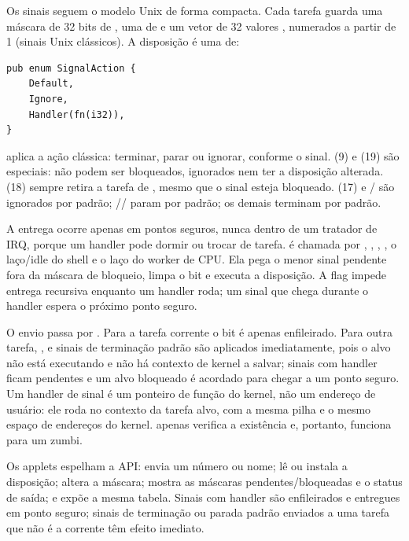 Os sinais seguem o modelo Unix de forma compacta. Cada tarefa guarda uma
m\'ascara de 32 bits de , uma de  e um vetor de 32
valores , numerados a partir de 1 (sinais Unix
cl\'assicos). A disposi\c{c}\~ao \'e uma de:

\begin{lstlisting}[caption={Disposi\c{c}\~oes de sinal.},label={lst:signalspt}]
pub enum SignalAction {
    Default,
    Ignore,
    Handler(fn(i32)),
}
\end{lstlisting}

 aplica a a\c{c}\~ao cl\'assica: terminar, parar ou ignorar,
conforme o sinal.  (9) e  (19) s\~ao especiais:
n\~ao podem ser bloqueados, ignorados nem ter a disposi\c{c}\~ao alterada.
 (18) sempre retira a tarefa de , mesmo que o
sinal esteja bloqueado.  (17) e
/ s\~ao ignorados por padr\~ao;
// param por padr\~ao; os demais
terminam por padr\~ao.

A entrega ocorre apenas em pontos seguros, nunca dentro de um tratador de
IRQ, porque um handler pode dormir ou trocar de tarefa. 
\'e chamada por , , ,
, o la\c{c}o/idle do shell e o la\c{c}o do worker de CPU.
Ela pega o menor sinal pendente fora da m\'ascara de bloqueio, limpa o bit e
executa a disposi\c{c}\~ao. A flag  impede entrega
recursiva enquanto um handler roda; um sinal que chega durante o handler
espera o pr\'oximo ponto seguro.

O envio passa por . Para a tarefa corrente o bit
\'e apenas enfileirado. Para outra tarefa, ,  e
sinais de termina\c{c}\~ao padr\~ao s\~ao aplicados imediatamente, pois o alvo
n\~ao est\'a executando e n\~ao h\'a contexto de kernel a salvar; sinais com
handler ficam pendentes e um alvo bloqueado \'e acordado para chegar a um
ponto seguro. Um handler de sinal \'e um ponteiro de fun\c{c}\~ao do kernel,
n\~ao um endere\c{c}o de usu\'ario: ele roda no contexto da tarefa alvo, com a
mesma pilha e o mesmo espa\c{c}o de endere\c{c}os do kernel.
 apenas verifica a exist\^encia e, portanto, funciona para
um zumbi.

Os applets espelham a API:  envia um n\'umero ou nome;
 l\^e ou instala a disposi\c{c}\~ao;  altera a
m\'ascara;  mostra as m\'ascaras pendentes/bloqueadas e o status de
sa\'ida; e  exp\~oe a mesma tabela. Sinais com handler s\~ao
enfileirados e entregues em ponto seguro; sinais de termina\c{c}\~ao ou parada
padr\~ao enviados a uma tarefa que n\~ao \'e a corrente t\^em efeito imediato.

